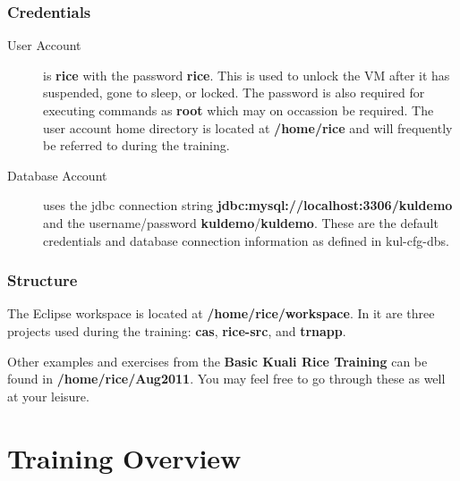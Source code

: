 \documentclass[letterpaper,notitlepage,12pt]{book}
\begin{document}
\subsubsection*{Credentials}
\begin{description}
\item [User Account] is \textbf{rice} with the password
  \textbf{rice}. This is used to unlock the VM after it has suspended,
  gone to sleep, or locked. The password is also required for
  executing commands as \textbf{root} which may on occassion be
  required. The user account home directory is located at
  \textbf{/home/rice} and will frequently be referred to during the training.
\item [Database Account] uses the jdbc connection string
  \textbf{jdbc:mysql://localhost:3306/kuldemo} and the
  username/password \textbf{kuldemo}/\textbf{kuldemo}. These are the
  default credentials and database connection information as defined
  in kul-cfg-dbs.
\end{description}

\subsubsection*{Structure}
The Eclipse workspace is located at \textbf{/home/rice/workspace}. In
it are three projects used during the training: \textbf{cas},
\textbf{rice-src}, and \textbf{trnapp}.

Other examples and exercises from the \textbf{Basic Kuali Rice
  Training} can be found in \textbf{/home/rice/Aug2011}. You may feel
free to go through these as well at your leisure.

\section*{Training Overview}






\end{document}
